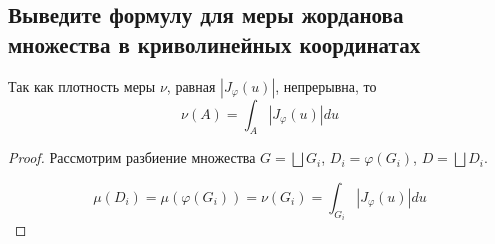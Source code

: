 
\subsection{Выведите формулу для меры жорданова множества в криволинейных координатах}

\begin{proposition*}
    Так как плотность меры $\nu$, равная $|J_\varphi(u)|$, непрерывна, то
    \begin{equation*}
        \nu(A) = \int_A |J_\varphi(u)| du
    \end{equation*}    
\end{proposition*}
\begin{proof}
    Рассмотрим разбиение множества $G = \bigsqcup G_i$, $D_i = \varphi(G_i)$, $D = \bigsqcup D_i$. 

    \begin{equation*}
        \mu(D_i) = \mu(\varphi(G_i)) = \nu(G_i) = \int_{G_i} |J_\varphi(u)| du
    \end{equation*}
\end{proof}